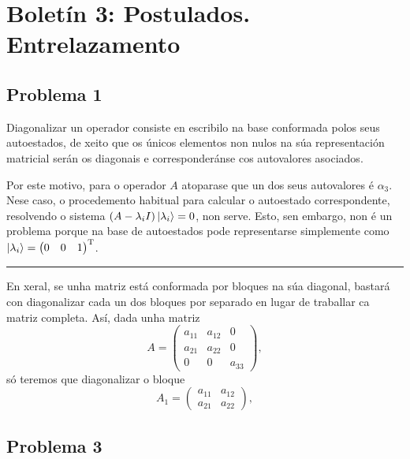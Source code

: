 \documentclass[a4paper,12pt]{article}
\begin{document}
\newpage
\section*{Boletín 3: Postulados. Entrelazamento}

\subsection*{Problema 1}

Diagonalizar un operador consiste en escribilo na base conformada polos seus autoestados, de xeito que os únicos elementos non nulos na súa representación matricial serán os diagonais e corresponderánse cos autovalores asociados. 

Por este motivo, para o operador $A$ atoparase que un dos seus autovalores é $\alpha_3$. Nese caso, o procedemento habitual para calcular o autoestado correspondente, resolvendo o sistema $(A - \lambda_i I)\ket{\lambda_i} = 0$, non serve. Esto, sen embargo, non é un problema porque na base de autoestados pode representarse simplemente como $\ket{\lambda_i} = \begin{pmatrix} 0 & 0 & 1 \end{pmatrix}^\mathrm{T}$.

\begin{center} \hrule \end{center}

En xeral, se unha matriz está conformada por bloques na súa diagonal, bastará con diagonalizar cada un dos bloques por separado en lugar de traballar ca matriz completa. Así, dada unha matriz
\begin{equation}
	A = \begin{pmatrix} a_{11} & a_{12} & 0 \\ a_{21} & a_{22} & 0 \\ 0 & 0 & a_{33} \end{pmatrix},
\end{equation}
\noindent
só teremos que diagonalizar o bloque
\begin{equation}
	A_{1} = \begin{pmatrix} a_{11} & a_{12} \\ a_{21} & a_{22} \end{pmatrix},
\end{equation}

\subsection*{Problema 3}
\end{document}
